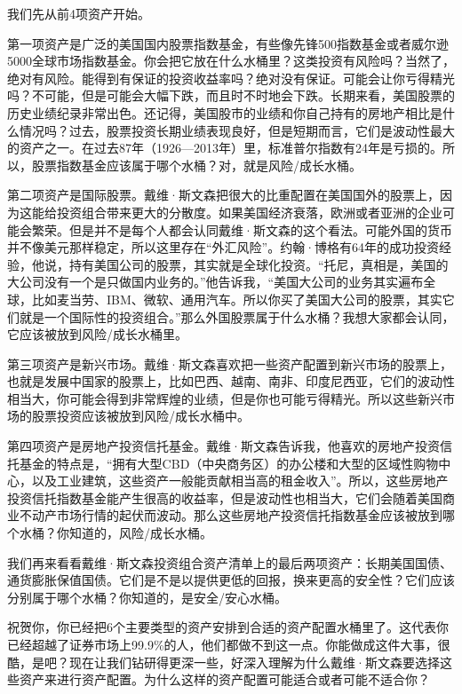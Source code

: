 

我们先从前4项资产开始。

第一项资产是广泛的美国国内股票指数基金，有些像先锋500指数基金或者威尔逊5000全球市场指数基金。你会把它放在什么水桶里？这类投资有风险吗？当然了，绝对有风险。能得到有保证的投资收益率吗？绝对没有保证。可能会让你亏得精光吗？不可能，但是可能会大幅下跌，而且时不时地会下跌。长期来看，美国股票的历史业绩纪录非常出色。还记得，美国股市的业绩和你自己持有的房地产相比是什么情况吗？过去，股票投资长期业绩表现良好，但是短期而言，它们是波动性最大的资产之一。在过去87年（1926—2013年）里，标准普尔指数有24年是亏损的。所以，股票指数基金应该属于哪个水桶？对，就是风险/成长水桶。

第二项资产是国际股票。戴维·斯文森把很大的比重配置在美国国外的股票上，因为这能给投资组合带来更大的分散度。如果美国经济衰落，欧洲或者亚洲的企业可能会繁荣。但是并不是每个人都会认同戴维·斯文森的这个看法。可能外国的货币并不像美元那样稳定，所以这里存在“外汇风险”。约翰·博格有64年的成功投资经验，他说，持有美国公司的股票，其实就是全球化投资。“托尼，真相是，美国的大公司没有一个是只做国内业务的。”他告诉我，“美国大公司的业务其实遍布全球，比如麦当劳、IBM、微软、通用汽车。所以你买了美国大公司的股票，其实它们就是一个国际性的投资组合。”那么外国股票属于什么水桶？我想大家都会认同，它应该被放到风险/成长水桶里。

第三项资产是新兴市场。戴维·斯文森喜欢把一些资产配置到新兴市场的股票上，也就是发展中国家的股票上，比如巴西、越南、南非、印度尼西亚，它们的波动性相当大，你可能会得到非常辉煌的业绩，但是你也可能亏得精光。所以这些新兴市场的股票投资应该被放到风险/成长水桶中。

第四项资产是房地产投资信托基金。戴维·斯文森告诉我，他喜欢的房地产投资信托基金的特点是，“拥有大型CBD（中央商务区）的办公楼和大型的区域性购物中心，以及工业建筑，这些资产一般能贡献相当高的租金收入”。所以，这些房地产投资信托指数基金能产生很高的收益率，但是波动性也相当大，它们会随着美国商业不动产市场行情的起伏而波动。那么这些房地产投资信托指数基金应该被放到哪个水桶？你知道的，风险/成长水桶。

我们再来看看戴维·斯文森投资组合资产清单上的最后两项资产：长期美国国债、通货膨胀保值国债。它们是不是以提供更低的回报，换来更高的安全性？它们应该分别属于哪个水桶？你知道的，是安全/安心水桶。

祝贺你，你已经把6个主要类型的资产安排到合适的资产配置水桶里了。这代表你已经超越了证券市场上99.9\%的人，他们都做不到这一点。你能做成这件大事，很酷，是吧？现在让我们钻研得更深一些，好深入理解为什么戴维·斯文森要选择这些资产来进行资产配置。为什么这样的资产配置可能适合或者可能不适合你？


